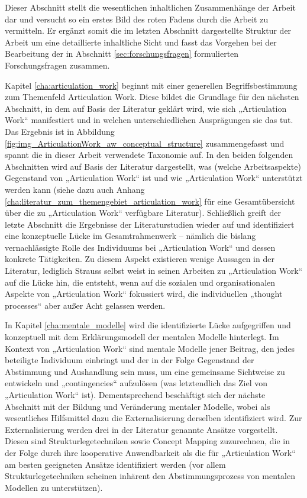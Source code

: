 Dieser Abschnitt stellt die wesentlichen inhaltlichen Zusammenhänge der Arbeit dar und versucht so ein erstes Bild des roten Fadens durch die Arbeit zu vermitteln. Er ergänzt somit die im letzten Abschnitt dargestellte Struktur der Arbeit um eine detaillierte inhaltliche Sicht und fasst das Vorgehen bei der Bearbeitung der in Abschnitt \ref{sec:forschungsfragen} formulierten Forschungsfragen zusammen.

Kapitel \ref{cha:articulation_work} beginnt mit einer generellen Begriffsbestimmung zum Themenfeld Articulation Work. Diese bildet die Grundlage für den nächsten Abschnitt, in dem auf Basis der Literatur geklärt wird, wie sich „Articulation Work“ manifestiert und in welchen unterschiedlichen Ausprägungen sie das tut. Das Ergebnis ist in Abbildung \ref{fig:img_ArticulationWork_aw_conceptual_structure} zusammengefasst und spannt die in dieser Arbeit verwendete Taxonomie auf. In den beiden folgenden Abschnitten wird auf Basis der Literatur dargestellt, was (welche Arbeitsaspekte) Gegenstand von „Articulation Work“ ist und wie „Articulation Work“ unterstützt werden kann (siehe dazu auch Anhang \ref{cha:literatur_zum_themengebiet_articulation_work} für eine Gesamtübersicht über die zu „Articulation Work“ verfügbare Literatur). Schließlich greift der letzte Abschnitt die Ergebnisse der Literaturstudien wieder auf und identifiziert eine konzeptuelle Lücke im Gesamtrahmenwerk -- nämlich die bislang vernachlässigte Rolle des Individuums bei „Articulation Work“ und dessen konkrete Tätigkeiten. Zu diesem Aspekt existieren wenige Aussagen in der Literatur, lediglich Strauss selbst weist in seinen Arbeiten zu „Articulation Work“ auf die Lücke hin, die entsteht, wenn auf die sozialen und organisationalen Aspekte von „Articulation Work“ fokussiert wird, die individuellen „thought processes“ aber außer Acht gelassen werden.

In Kapitel \ref{cha:mentale_modelle} wird die identifizierte Lücke aufgegriffen und konzeptuell mit dem Erklärungsmodell der mentalen Modelle hinterlegt. Im Kontext von „Articulation Work“ sind mentale Modelle jener Beitrag, den jedes beteiligte Individuum einbringt und der in der Folge Gegenstand der Abstimmung und Aushandlung sein muss, um eine gemeinsame Sichtweise zu entwickeln und „contingencies“ aufzulösen (was letztendlich das Ziel von „Articulation Work“ ist). Dementsprechend beschäftigt sich der nächste Abschnitt mit der Bildung und Veränderung mentaler Modelle, wobei als wesentliches Hilfsmittel dazu die Externalisierung derselben identifiziert wird. Zur Externalisierung werden drei in der Literatur genannte Ansätze vorgestellt. Diesen sind Strukturlegetechniken sowie Concept Mapping zuzurechnen, die in der Folge durch ihre kooperative Anwendbarkeit als die für „Articulation Work“ am besten geeigneten Ansätze identifiziert werden (vor allem Strukturlegetechniken scheinen inhärent den Abstimmungsprozess von mentalen Modellen zu unterstützen).

